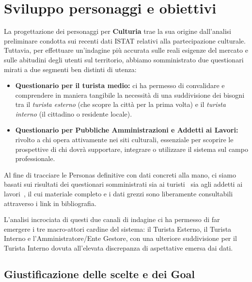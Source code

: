 \section{Sviluppo personaggi e obiettivi}

La progettazione dei personaggi per \textbf{Culturia} trae la sua origine dall'analisi preliminare condotta sui recenti dati ISTAT relativi alla partecipazione culturale. Tuttavia, per effettuare un'indagine più accurata sulle reali esigenze del mercato e sulle abitudini degli utenti sul territorio, abbiamo somministrato due questionari mirati a due segmenti ben distinti di utenza:

\begin{itemize}
    \item \textbf{Questionario per il turista medio:} ci ha permesso di convalidare e comprendere in maniera tangibile la necessità di una suddivisione dei bisogni tra il \textit{turista esterno} (che scopre la città per la prima volta) e il \textit{turista interno} (il cittadino o residente locale).
    \item \textbf{Questionario per Pubbliche Amministrazioni e Addetti ai Lavori:} rivolto a chi opera attivamente nei siti culturali, essenziale per scoprire le prospettive di chi dovrà supportare, integrare o utilizzare il sistema sul campo professionale.
\end{itemize}

Al fine di tracciare le Personas definitive con dati concreti alla mano, ci siamo basati sui risultati dei questionari somministrati sia ai turisti~\cite{quest_turisti, excel_turisti} sia agli addetti ai lavori~\cite{quest_addetti, excel_addetti}, il cui materiale completo e i dati grezzi sono liberamente consultabili attraverso i link in bibliografia.

L'analisi incrociata di questi due canali di indagine ci ha permesso di far emergere i tre macro-attori cardine del sistema: il Turista Esterno, il Turista Interno e l'Amministratore/Ente Gestore, con una ulteriore suddivisione per il Turista Interno dovuta all'elevata discrepanza di aspettative emersa dai dati.

\subsection{Giustificazione delle scelte e dei Goal}

